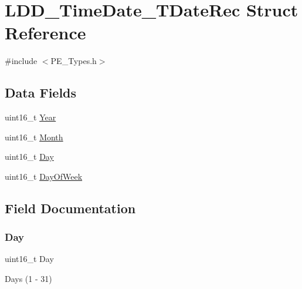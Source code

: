 \hypertarget{struct_l_d_d___time_date___t_date_rec}{}\section{L\+D\+D\+\_\+\+Time\+Date\+\_\+\+T\+Date\+Rec Struct Reference}
\label{struct_l_d_d___time_date___t_date_rec}


{\ttfamily \#include $<$P\+E\+\_\+\+Types.\+h$>$}

\subsection*{Data Fields}
\begin{DoxyCompactItemize}
\item 
uint16\+\_\+t \hyperlink{struct_l_d_d___time_date___t_date_rec_a5440b090b3d142031ea11ee8d350dc63}{Year}
\item 
uint16\+\_\+t \hyperlink{struct_l_d_d___time_date___t_date_rec_ae1709c38acb314b2626a1efb4d132c93}{Month}
\item 
uint16\+\_\+t \hyperlink{struct_l_d_d___time_date___t_date_rec_afc39d2c8bfc911e88c0265ee2afbf04f}{Day}
\item 
uint16\+\_\+t \hyperlink{struct_l_d_d___time_date___t_date_rec_a0341ac60135b797605a632403893ff21}{Day\+Of\+Week}
\end{DoxyCompactItemize}


\subsection{Field Documentation}
\mbox{\label{struct_l_d_d___time_date___t_date_rec_afc39d2c8bfc911e88c0265ee2afbf04f}} 
\subsubsection{\texorpdfstring{Day}{Day}}
{\footnotesize\ttfamily uint16\+\_\+t Day}

Days (1 -\/ 31) \mbox{\label{struct_l_d_d___time_date___t_date_rec_a0341ac60135b797605a632403893ff21}} 
